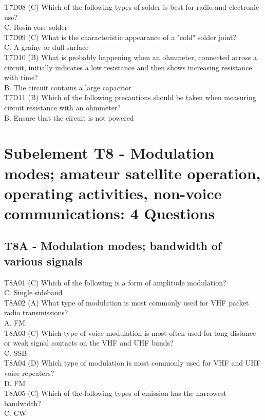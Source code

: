 \documentclass[12pt,letterpaper]{report}
\begin{document}
T7D08 (C) Which of the following types of solder is best for radio and electronic use?\\
C. Rosin-core solder\\

T7D09 (C) What is the characteristic appearance of a "cold" solder joint?\\
C. A grainy or dull surface\\

T7D10 (B) What is probably happening when an ohmmeter, connected across a circuit, initially indicates a low resistance and then shows increasing resistance with time?\\
B. The circuit contains a large capacitor\\

T7D11 (B) Which of the following precautions should be taken when measuring circuit resistance with an ohmmeter?\\
B. Ensure that the circuit is not powered\\

\chapter{Subelement T8 - Modulation modes; amateur satellite operation, operating activities, non-voice communications: 4 Questions}
\section{T8A - Modulation modes; bandwidth of various signals}   

T8A01 (C) Which of the following is a form of amplitude modulation?\\
C. Single sideband\\

T8A02 (A) What type of modulation is most commonly used for VHF packet radio transmissions?\\
A. FM\\

T8A03 (C) Which type of voice modulation is most often used for long-distance or weak signal contacts on the VHF and UHF bands?\\
C. SSB\\

T8A04 (D) Which type of modulation is most commonly used for VHF and UHF voice repeaters?\\
D. FM\\

T8A05 (C) Which of the following types of emission has the narrowest bandwidth?\\
C. CW\\
\end{document}
